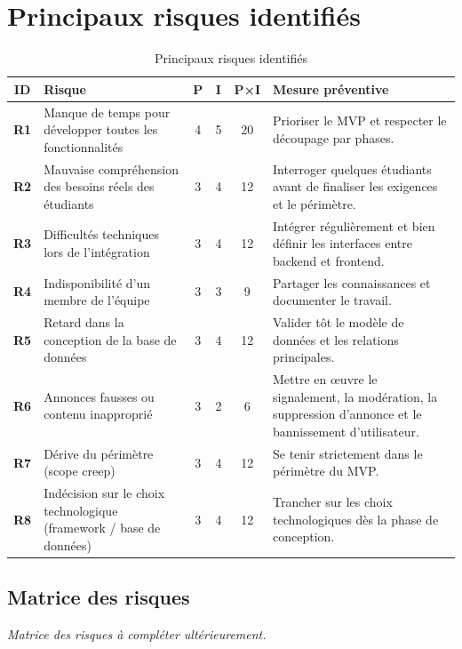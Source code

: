 ﻿\chapter{Principaux risques identifiés}

\begin{table}[ht]
\centering
\renewcommand{\arraystretch}{1.25}
\small
\begin{tabularx}{\textwidth}{>{\bfseries}c X c c c X}
\toprule
\textbf{ID} & \textbf{Risque} & \textbf{P} & \textbf{I} & \textbf{P×I} & \textbf{Mesure préventive} \\
\midrule
R1 & Manque de temps pour développer toutes les fonctionnalités & 4 & 5 & 20 & Prioriser le MVP et respecter le découpage par phases. \\
R2 & Mauvaise compréhension des besoins réels des étudiants & 3 & 4 & 12 & Interroger quelques étudiants avant de finaliser les exigences et le périmètre. \\
R3 & Difficultés techniques lors de l'intégration & 3 & 4 & 12 & Intégrer régulièrement et bien définir les interfaces entre backend et frontend. \\
R4 & Indisponibilité d'un membre de l'équipe & 3 & 3 & 9 & Partager les connaissances et documenter le travail. \\
R5 & Retard dans la conception de la base de données & 3 & 4 & 12 & Valider tôt le modèle de données et les relations principales. \\
R6 & Annonces fausses ou contenu inapproprié & 3 & 2 & 6 & Mettre en œuvre le signalement, la modération, la suppression d'annonce et le bannissement d'utilisateur. \\
R7 & Dérive du périmètre (scope creep) & 3 & 4 & 12 & Se tenir strictement dans le périmètre du MVP. \\
R8 & Indécision sur le choix technologique (framework / base de données) & 3 & 4 & 12 & Trancher sur les choix technologiques dès la phase de conception. \\
\bottomrule
\end{tabularx}
\caption{Principaux risques identifiés}
\end{table}

\section{Matrice des risques}

\textit{Matrice des risques à compléter ultérieurement.}
